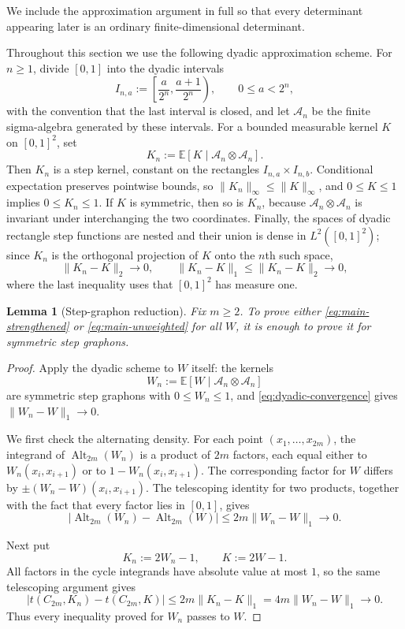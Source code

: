 \documentclass[11pt]{article}
\newtheorem{lemma}[theorem]{Lemma}
\newcommand{\Alt}{\operatorname{Alt}}
\begin{document}
We include the approximation argument in full so that every determinant
appearing later is an ordinary finite-dimensional determinant.

Throughout this section we use the following dyadic approximation
scheme.  For $n\ge 1$, divide $[0,1]$ into the dyadic intervals
\[
  I_{n,a}:=
  \left[\frac{a}{2^n},\frac{a+1}{2^n}\right),
  \qquad 0\le a<2^n,
\]
with the convention that the last interval is closed, and let
$\mathcal A_n$ be the finite sigma-algebra generated by these
intervals.  For a bounded measurable kernel $K$ on $[0,1]^2$, set
\[
  K_n:=\mathbb E[K\mid \mathcal A_n\otimes\mathcal A_n].
\]
Then $K_n$ is a step kernel, constant on the rectangles
$I_{n,a}\times I_{n,b}$.  Conditional expectation preserves pointwise
bounds, so $\|K_n\|_\infty\le\|K\|_\infty$, and $0\le K\le1$ implies
$0\le K_n\le1$.  If $K$ is symmetric, then so is $K_n$, because
$\mathcal A_n\otimes\mathcal A_n$ is invariant under interchanging the
two coordinates.  Finally, the spaces of dyadic rectangle step
functions are nested and their union is dense in $L^2([0,1]^2)$; since
$K_n$ is the orthogonal projection of $K$ onto the $n$th such space,
\begin{equation}
  \|K_n-K\|_2\longrightarrow0,
  \qquad
  \|K_n-K\|_1\le\|K_n-K\|_2\longrightarrow0,
  \label{eq:dyadic-convergence}
\end{equation}
where the last inequality uses that $[0,1]^2$ has measure one.

\begin{lemma}[Step-graphon reduction]
\label{lem:step-reduction}
Fix $m\ge 2$.  To prove either
\eqref{eq:main-strengthened} or \eqref{eq:main-unweighted} for all
$W$, it is enough to prove it for symmetric step graphons.
\end{lemma}

\begin{proof}
Apply the dyadic scheme to $W$ itself: the kernels
\[
  W_n:=\mathbb E[W\mid \mathcal A_n\otimes\mathcal A_n]
\]
are symmetric step graphons with $0\le W_n\le1$, and
\eqref{eq:dyadic-convergence} gives $\|W_n-W\|_1\to0$.

We first check the alternating density.  For each point
$(x_1,\ldots,x_{2m})$, the integrand of $\Alt_{2m}(W_n)$ is a product
of $2m$ factors, each equal either to $W_n(x_i,x_{i+1})$ or to
$1-W_n(x_i,x_{i+1})$.  The corresponding factor for $W$ differs by
$\pm(W_n-W)(x_i,x_{i+1})$.  The telescoping identity for two products,
together with the fact that every factor lies in $[0,1]$, gives
\[
  |\Alt_{2m}(W_n)-\Alt_{2m}(W)|
  \le 2m\|W_n-W\|_1
  \longrightarrow0.
\]

Next put
\[
  K_n:=2W_n-1,
  \qquad
  K:=2W-1.
\]
All factors in the cycle integrands have absolute value at most $1$,
so the same telescoping argument gives
\[
  |t(C_{2m},K_n)-t(C_{2m},K)|
  \le 2m\|K_n-K\|_1
  =4m\|W_n-W\|_1
  \longrightarrow0.
\]
Thus every inequality proved for $W_n$ passes to $W$.
\end{proof}
\end{document}
